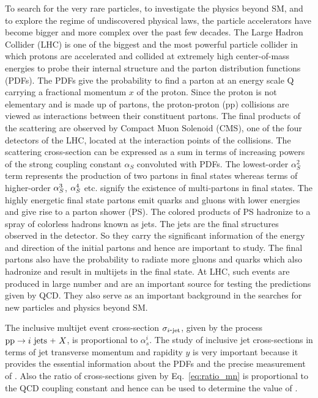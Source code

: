 To search for the very rare particles, to investigate the physics beyond SM, and to explore the regime of undiscovered physical laws, the particle accelerators have become bigger and more complex over the past few decades. The Large Hadron Collider (LHC) is one of the biggest and the most powerful particle collider in which protons are accelerated and collided at extremely high center-of-mass energies to probe their internal structure and the parton distribution functions (PDFs). The PDFs give the probability to find a parton at an energy scale Q carrying a fractional momentum $x$ of the proton. Since the proton is not elementary and is made up of partons, the proton-proton (pp) collisions are viewed as interactions between their constituent partons. The final products of the scattering are observed by Compact Muon Solenoid (CMS), one of the four detectors of the LHC, located at the interaction points of the collisions. The scattering cross-section can be expressed as a sum in terms of increasing powers of the strong coupling constant $\alpha_{S}$ convoluted with PDFs. The lowest-order $\alpha_{S}^{2}$ term represents the production of two partons in final states whereas terms of higher-order $\alpha_S^3$, $\alpha_S^4$ etc. signify the existence of multi-partons in final states. The highly energetic final state partons emit quarks and gluons with lower energies and give rise to a parton shower (PS). The colored products of PS hadronize to a spray of colorless hadrons known as jets. The jets are the final structures observed in the detector. So they carry the significant information of the energy and direction of the initial partons and hence are important to study. The final partons also have the probability to radiate more gluons and quarks which also hadronize and result in multijets in the final state. At LHC, such events are produced in large number and are an important source for testing the predictions given by QCD. They also serve as an important background in the searches for new particles and physics beyond SM. 

The inclusive multijet event cross-section $\sigma_{i\mbox{-}{\rm jet}}$, given by the process ${{\rm pp}\to i~{\rm jets}~\plus X}$, is proportional to $\alpha^{i}_{s}$. The study of inclusive jet cross-sections in terms of jet transverse momentum \pt and rapidity $y$ is very important because it provides the essential information about the PDFs and the precise measurement of \alps. Also the ratio of cross-sections given by Eq.~\ref{eq:ratio_mn} is proportional to the QCD coupling constant \alps and hence can be used to determine the value of \alps. 

